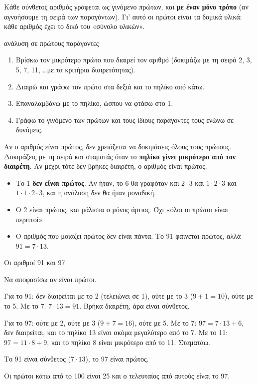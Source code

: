 
Κάθε σύνθετος αριθμός γράφεται ως γινόμενο πρώτων, και \textbf{με έναν μόνο τρόπο} (αν αγνοήσουμε τη σειρά των παραγόντων). Γι' αυτό οι πρώτοι είναι τα δομικά υλικά: κάθε αριθμός έχει το δικό του «σύνολο υλικών».

\begin{kanonas}{ανάλυση σε πρώτους παράγοντες}
\begin{enumerate}[leftmargin=1.6em,itemsep=0.2ex,topsep=2pt]
\item Βρίσκω τον μικρότερο πρώτο που διαιρεί τον αριθμό (δοκιμάζω με τη σειρά 2, 3, 5, 7, 11, \dots με τα κριτήρια διαιρετότητας).
\item Διαιρώ και γράφω τον πρώτο στα δεξιά και το πηλίκο από κάτω.
\item Επαναλαμβάνω με το πηλίκο, ώσπου να φτάσω στο 1.
\item Γράφω το γινόμενο των πρώτων και τους ίδιους παράγοντες τους ενώνω σε δυνάμεις.
\end{enumerate}
\end{kanonas}

Αν ο αριθμός είναι πρώτος, δεν χρειάζεται να δοκιμάσεις όλους τους πρώτους. Δοκιμάζεις με τη σειρά και σταματάς όταν το \textbf{πηλίκο γίνει μικρότερο από τον διαιρέτη}. Αν μέχρι τότε δεν βρήκες διαιρέτη, ο αριθμός είναι πρώτος.

\begin{prosoxi}
\begin{itemize}[leftmargin=1.2em,itemsep=0.3ex,topsep=2pt]
\item Το 1 \textbf{δεν είναι πρώτος}. Αν ήταν, το 6 θα γραφόταν και $2\cdot 3$ και $1\cdot 2\cdot 3$ και $1\cdot 1\cdot 2\cdot 3$, και η ανάλυση δεν θα ήταν μοναδική.
\item Ο 2 είναι πρώτος, και μάλιστα ο μόνος άρτιος. Όχι «όλοι οι πρώτοι είναι περιττοί».
\item Ο αριθμός που μοιάζει πρώτος δεν είναι πάντα. Το 91 φαίνεται πρώτος, αλλά $91=7\cdot 13$.
\end{itemize}
\end{prosoxi}


\tixero Οι αριθμοί 91 και 97.\par
\tithelo Να αποφασίσω αν είναι πρώτοι.\par
\possindeo Για το 91: δεν διαιρείται με το 2 (τελειώνει σε 1), ούτε με το 3 ($9+1=10$), ούτε με το 5. Με το 7: $7\cdot 13=91$. Βρήκα διαιρέτη, άρα είναι σύνθετος.\par
Για το 97: ούτε με 2, ούτε με 3 ($9+7=16$), ούτε με 5. Με το 7: $97=7\cdot 13+6$, δεν διαιρείται, και το πηλίκο 13 είναι ακόμα μεγαλύτερο από το 7. Με το 11: $97=11\cdot 8+9$, και το πηλίκο 8 είναι μικρότερο από το 11. Σταματάω.\par
\apantisi Το 91 είναι σύνθετος ($7\cdot 13$), το 97 είναι πρώτος.\par
\elegxos Οι πρώτοι κάτω από το 100 είναι 25 και ο τελευταίος από αυτούς είναι το 97.

